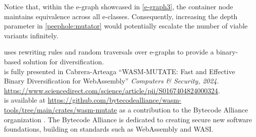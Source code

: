Notice that, within the e-graph showcased in \autoref{e-graph3}, the container node maintains equivalence across all e-classes. 
Consequently, increasing the depth parameter in \autoref{peephole:mutator} would potentially escalate the number of viable variants infinitely.




\begin{tcolorbox}[title=Contribution paper and artifact,boxrule=1pt,arc=.2em,boxsep=0.5mm]
  \tool uses rewriting rules and random traversals over e-graphs to provide a binary-based solution for \Wasm diversification. \\
  \tool is fully presented in Cabrera-Arteaga \etal ``WASM-MUTATE: Fast and Effective Binary Diversification for WebAssembly''
  \emph{Computers \& Security, 2024. }
 \url{https://www.sciencedirect.com/science/article/pii/S0167404824000324}.
  \\
  \tool is available at \url{https://github.com/bytecodealliance/wasm-tools/tree/main/crates/wasm-mutate} as a contribution to the Bytecode Alliance organization . The Bytecode Alliance is dedicated to creating secure new software foundations, building on standards such as WebAssembly and WASI.
\end{tcolorbox}